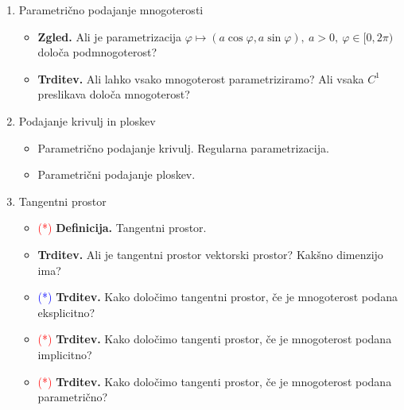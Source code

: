 \begin{enumerate}
    \item Parametrično podajanje mnogoterosti
    \begin{itemize}
        \item \textbf{Zgled.} Ali je parametrizacija $\varphi \mapsto (a \cos \varphi, a \sin \varphi), \ a > 0, \ \varphi \in [0, 2 \pi)$ določa podmnogoterost?
        \item \textbf{Trditev.} Ali lahko vsako mnogoterost parametriziramo? Ali vsaka \(C^1\) preslikava določa mnogoterost?
    \end{itemize}

    \item Podajanje krivulj in ploskev
    \begin{itemize}
        \item Parametrično podajanje krivulj. Regularna parametrizacija.
        \item Parametrični podajanje ploskev.
    \end{itemize}

    \item Tangentni prostor
    \begin{itemize}
        \item \textcolor{red}{(*)} \textbf{Definicija.} Tangentni prostor.
        \item \textbf{Trditev.} Ali je tangentni prostor vektorski prostor? Kakšno dimenzijo ima?
        \item \textcolor{blue}{(*)} \textbf{Trditev.} Kako določimo tangentni prostor, če je mnogoterost podana eksplicitno? 
        \item \textcolor{red}{(*)} \textbf{Trditev.} Kako določimo tangenti prostor, če je mnogoterost podana implicitno?
        \item \textcolor{red}{(*)} \textbf{Trditev.} Kako določimo tangenti prostor, če je mnogoterost podana parametrično?
    \end{itemize}
\end{enumerate}

